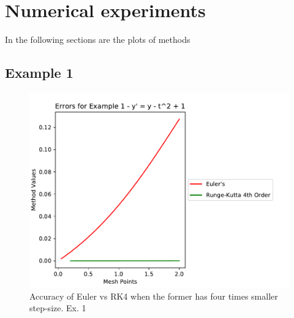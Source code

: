 \documentclass[11pt]{article}	%
\begin{document}

\section{Numerical experiments}
In the following sections are the plots of methods 

\newpage
\subsection{Example 1}
\begin{figure}[H]
\centering
\includegraphics[width=.45\textwidth]{euler_rk4_1}
\caption{Accuracy of Euler vs RK4 when the former has four times smaller step-size. Ex. 1}
\label{fig:euler_rk4_1}
\end{figure}
\end{document}
